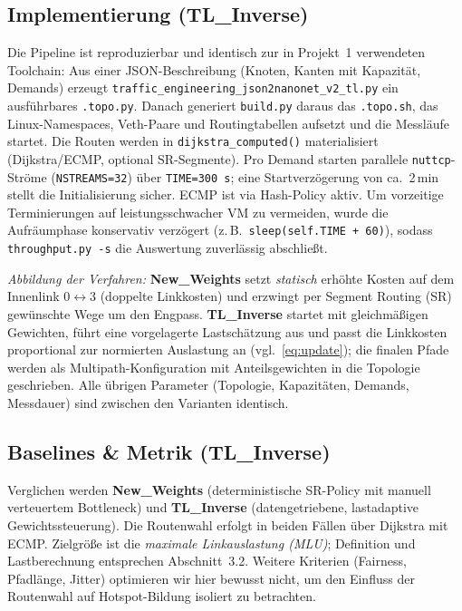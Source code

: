 \documentclass[sigconf,nonacm,review]{acmart}
\begin{document}
\subsection{Implementierung (TL\_Inverse)}
Die Pipeline ist reproduzierbar und identisch zur in Projekt~1 verwendeten Toolchain: Aus einer JSON-Beschreibung (Knoten, Kanten mit Kapazität, Demands) erzeugt \texttt{\nolinkurl{traffic_engineering_json2nanonet_v2_tl.py}} ein ausführbares \texttt{.topo.py}. Danach generiert \texttt{\nolinkurl{build.py}} daraus das \texttt{.topo.sh}, das Linux-Namespaces, Veth-Paare und Routingtabellen aufsetzt und die Messläufe startet. Die Routen werden in \texttt{\nolinkurl{dijkstra_computed()}} materialisiert (Dijkstra/ECMP, optional SR-Segmente). Pro Demand starten parallele \texttt{nuttcp}-Ströme (\texttt{NSTREAMS=32}) über \texttt{TIME=300\,s}; eine Startverzögerung von ca.\ 2\,min stellt die Initialisierung sicher. ECMP ist via Hash-Policy aktiv. Um vorzeitige Terminierungen auf leistungsschwacher VM zu vermeiden, wurde die Aufräumphase konservativ verzögert (z.\,B.\ \verb|sleep(self.TIME + 60)|), sodass \texttt{throughput.py -s} die Auswertung zuverlässig abschließt.

\emph{Abbildung der Verfahren:} \textbf{New\_Weights} setzt \emph{statisch} erhöhte Kosten auf dem Innenlink $0\leftrightarrow3$ (doppelte Linkkosten) und erzwingt per Segment Routing (SR) gewünschte Wege um den Engpass. \textbf{TL\_Inverse} startet mit gleichmäßigen Gewichten, führt eine vorgelagerte Lastschätzung aus und passt die Linkkosten proportional zur normierten Auslastung an (vgl.\ \eqref{eq:update}); die finalen Pfade werden als Multipath-Konfiguration mit Anteilsgewichten in die Topologie geschrieben. Alle übrigen Parameter (Topologie, Kapazitäten, Demands, Messdauer) sind zwischen den Varianten identisch.

\subsection{Baselines \& Metrik (TL\_Inverse)}
Verglichen werden \textbf{New\_Weights} (deterministische SR-Policy mit manuell verteuertem Bottleneck) und \textbf{TL\_Inverse} (datengetriebene, lastadaptive Gewichtssteuerung). Die Routenwahl erfolgt in beiden Fällen über Dijkstra mit ECMP. Zielgröße ist die \emph{maximale Linkauslastung (MLU)}; Definition und Lastberechnung entsprechen Abschnitt~3.2. Weitere Kriterien (Fairness, Pfadlänge, Jitter) optimieren wir hier bewusst nicht, um den Einfluss der Routenwahl auf Hotspot-Bildung isoliert zu betrachten.
\end{document}
